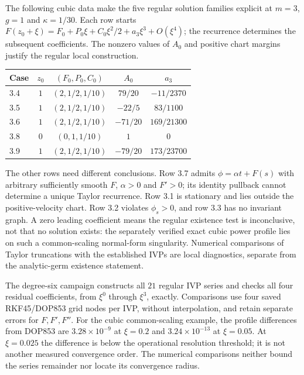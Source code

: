 The following cubic data make the five regular solution families explicit
at $m=3$, $g=1$ and $\kappa=1/30$. Each row starts
$F(z_0+\xi)=F_0+P_0\xi+C_0\xi^2/2+a_3\xi^3+O(\xi^4)$;
the recurrence determines the subsequent coefficients. The nonzero values
of $A_0$ and positive chart margins justify the regular local construction.
\begin{center}\small
\begin{tabular}{@{}lcccc@{}}
\toprule
Case & $z_0$ & $(F_0,P_0,C_0)$ & $A_0$ & $a_3$\\
\midrule
3.4 & $1$ & $(2,1/2,1/10)$ & $79/20$ & $-11/2370$\\
3.5 & $1$ & $(2,1/2,1/10)$ & $-22/5$ & $83/1100$\\
3.6 & $1$ & $(2,1/2,1/10)$ & $-71/20$ & $169/21300$\\
3.8 & $0$ & $(0,1,1/10)$ & $1$ & $0$\\
3.9 & $1$ & $(2,1/2,1/10)$ & $-79/20$ & $173/23700$\\
\bottomrule
\end{tabular}
\end{center}

The other rows need different conclusions. Row 3.7 admits
$\phi=\alpha t+F(s)$ with arbitrary sufficiently smooth $F$, $\alpha>0$
and $F'>0$; its identity pullback cannot determine a unique Taylor
recurrence. Row 3.1 is stationary and lies outside the positive-velocity
chart. Row 3.2 violates $\phi_s>0$, and row 3.3 has no invariant graph.
A zero leading coefficient means the regular existence test is inconclusive,
not that no solution exists: the separately verified exact cubic power
profile lies on such a common-scaling normal-form singularity. Numerical
comparisons of Taylor truncations with the established IVPs are local
diagnostics, separate from the analytic-germ existence statement.

The degree-six campaign constructs all $21$ regular IVP series and checks
all four residual coefficients, from $\xi^0$ through $\xi^3$, exactly.
Comparisons use four saved RKF45/DOP853 grid nodes per IVP, without
interpolation, and retain separate errors for $F,F',F''$. For the cubic
common-scaling example, the profile differences from DOP853 are
$3.28\times10^{-9}$ at $\xi=0.2$ and $3.24\times10^{-13}$ at $\xi=0.05$.
At $\xi=0.025$ the difference is below the operational resolution threshold;
it is not another measured convergence order. The numerical comparisons
neither bound the series remainder nor locate its convergence radius.
